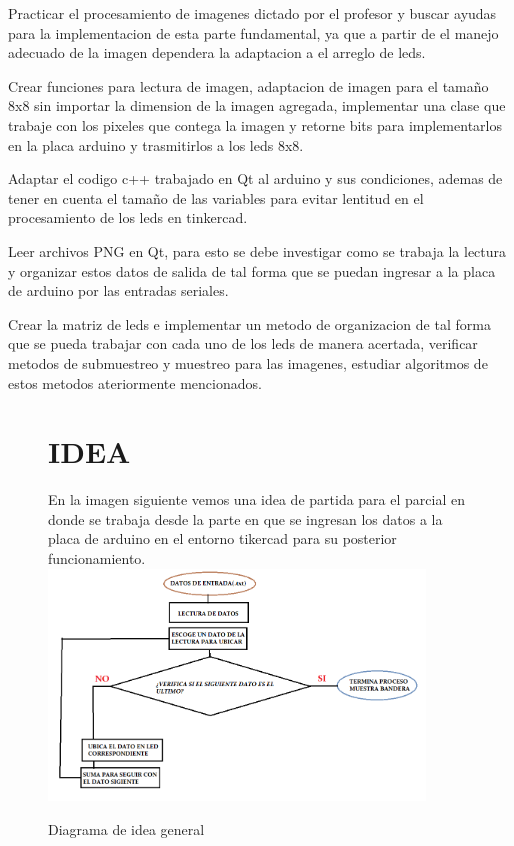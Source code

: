 \documentclass{article}
\begin{document}
Practicar el procesamiento de imagenes dictado por el profesor y buscar ayudas para la implementacion de esta parte fundamental, ya que a partir de el manejo adecuado de la imagen dependera la adaptacion a el arreglo de leds.

Crear funciones para lectura de imagen, adaptacion de imagen para el tamaño 8x8 sin importar la dimension de la imagen agregada, implementar una clase que trabaje con los pixeles que contega la imagen y retorne bits para implementarlos en la placa arduino y trasmitirlos a los leds 8x8.

Adaptar el codigo c++ trabajado en Qt al arduino y sus condiciones, ademas de tener en cuenta el tamaño de las variables para evitar lentitud en el procesamiento de los leds en tinkercad.

Leer archivos PNG en Qt, para esto se debe investigar como se trabaja la lectura y organizar estos datos de salida de tal forma que se puedan ingresar a la placa de arduino por las entradas seriales.

Crear la matriz de leds e implementar un metodo de organizacion de tal forma que se pueda trabajar con cada uno  de los leds de manera acertada, verificar metodos de submuestreo y muestreo para las imagenes, estudiar algoritmos de estos metodos ateriormente mencionados.

\begin{figure}
\section{IDEA}
En la imagen siguiente vemos una idea de partida para el parcial en donde se trabaja desde la parte en que se ingresan los datos a la placa de arduino en el entorno tikercad para su posterior funcionamiento.\\
    \includegraphics[width=10cm]{diagrama.png}
    \centering
    \caption{Diagrama de idea general}
    \label{fig:diagrama}
    \end{figure}
\end{document}
